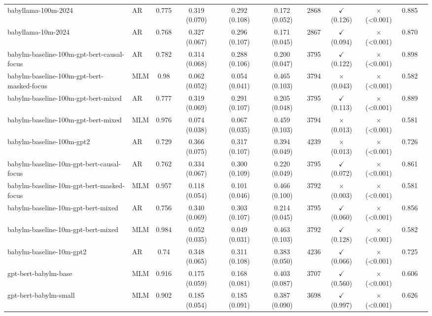 \begin{table}[]
\begin{adjustbox}{max width=\textwidth}
\begin{tabular}{llccccccccc}
babyllama-100m-2024 & AR & 0.775 & 0.319 (0.070) & 0.292 (0.108) & 0.172 (0.052) & 2868 & $\checkmark$ (0.126) & $\times$ (<0.001) & 0.885 \\
babyllama-10m-2024 & AR & 0.768 & 0.327 (0.067) & 0.296 (0.107) & 0.171 (0.045) & 2867 & $\checkmark$ (0.094) & $\times$ (<0.001) & 0.870 \\
babylm-baseline-100m-gpt-bert-causal-focus & AR & 0.782 & 0.314 (0.068) & 0.288 (0.106) & 0.200 (0.047) & 3795 & $\checkmark$ (0.122) & $\times$ (<0.001) & 0.898 \\
babylm-baseline-100m-gpt-bert-masked-focus & MLM & 0.98 & 0.062 (0.052) & 0.054 (0.041) & 0.465 (0.103) & 3794 & $\times$ (0.043) & $\times$ (<0.001) & 0.582 \\
babylm-baseline-100m-gpt-bert-mixed & AR & 0.777 & 0.319 (0.069) & 0.291 (0.107) & 0.205 (0.048) & 3795 & $\checkmark$ (0.113) & $\times$ (<0.001) & 0.889 \\
babylm-baseline-100m-gpt-bert-mixed & MLM & 0.976 & 0.074 (0.038) & 0.067 (0.035) & 0.459 (0.103) & 3794 & $\times$ (0.013) & $\times$ (<0.001) & 0.581 \\
babylm-baseline-100m-gpt2 & AR & 0.729 & 0.366 (0.075) & 0.317 (0.107) & 0.394 (0.049) & 4239 & $\times$ (0.013) & $\times$ (<0.001) & 0.726 \\
babylm-baseline-10m-gpt-bert-causal-focus & AR & 0.762 & 0.334 (0.067) & 0.300 (0.109) & 0.220 (0.049) & 3795 & $\checkmark$ (0.072) & $\times$ (<0.001) & 0.861 \\
babylm-baseline-10m-gpt-bert-masked-focus & MLM & 0.957 & 0.118 (0.054) & 0.101 (0.046) & 0.466 (0.100) & 3792 & $\times$ (0.003) & $\times$ (<0.001) & 0.581 \\
babylm-baseline-10m-gpt-bert-mixed & AR & 0.756 & 0.340 (0.069) & 0.303 (0.107) & 0.214 (0.045) & 3795 & $\checkmark$ (0.060) & $\times$ (<0.001) & 0.856 \\
babylm-baseline-10m-gpt-bert-mixed & MLM & 0.984 & 0.052 (0.035) & 0.049 (0.031) & 0.463 (0.103) & 3792 & $\checkmark$ (0.128) & $\times$ (<0.001) & 0.582 \\
babylm-baseline-10m-gpt2 & AR & 0.74 & 0.348 (0.065) & 0.311 (0.108) & 0.383 (0.050) & 4236 & $\checkmark$ (0.066) & $\times$ (<0.001) & 0.725 \\
gpt-bert-babylm-base & MLM & 0.916 & 0.175 (0.059) & 0.168 (0.081) & 0.403 (0.087) & 3707 & $\checkmark$ (0.560) & $\times$ (<0.001) & 0.606 \\
gpt-bert-babylm-small & MLM & 0.902 & 0.185 (0.054) & 0.185 (0.091) & 0.387 (0.090) & 3698 & $\checkmark$ (0.997) & $\times$ (<0.001) & 0.626 \\

\end{tabular}
\end{adjustbox}
\end{table}
